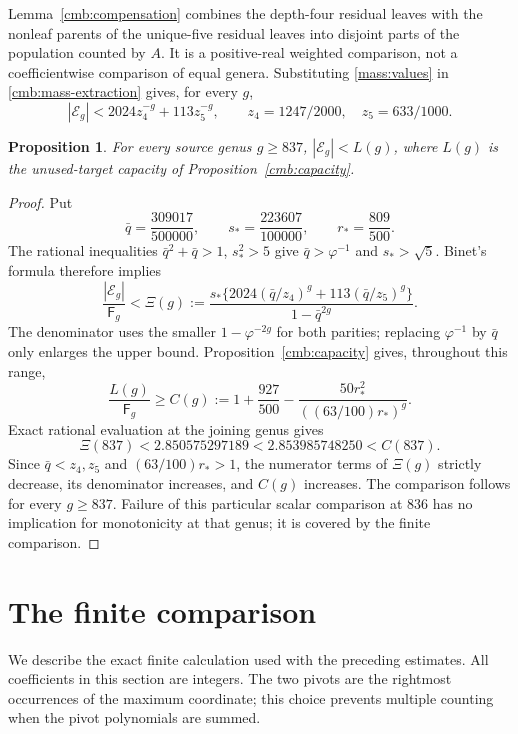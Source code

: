 \documentclass[11pt]{amsart}
\newtheorem{proposition}[theorem]{Proposition}
\theoremstyle{definition}
\theoremstyle{remark}
\newcommand{\Fib}{\mathsf F}
\numberwithin{equation}{section}
\begin{document}
Lemma~\ref{cmb:compensation} combines the depth-four residual leaves
with the nonleaf parents of the unique-five residual leaves into disjoint
parts of the population counted by $A$. It is a positive-real weighted
comparison, not a coefficientwise comparison of equal genera. Substituting
\eqref{mass:values} in \eqref{cmb:mass-extraction} gives, for every $g$,
\begin{equation}\label{mass:residual}
 |\mathcal E_g|<2024z_4^{-g}+113z_5^{-g},\qquad
 z_4=1247/2000,\quad z_5=633/1000.
\end{equation}

\begin{proposition}\label{mass:tail}
For every source genus $g\ge837$,
$|\mathcal E_g|<L(g)$, where $L(g)$ is the unused-target capacity
of Proposition~\ref{cmb:capacity}.
\end{proposition}

\begin{proof}
Put
\[
 \bar q=\frac{309017}{500000},\qquad s_* =\frac{223607}{100000},
 \qquad r_* =\frac{809}{500}.
\]
The rational inequalities $\bar q^2+\bar q>1$, $s_*^2>5$ give
$\bar q>\varphi^{-1}$ and $s_*>\sqrt5$. Binet's formula therefore implies
\[
 \frac{|\mathcal E_g|}{\Fib_g}
 < \Xi(g):=\frac{s_*\{2024(\bar q/z_4)^g+113(\bar q/z_5)^g\}}
 {1-\bar q^{2g}}.
\]
The denominator uses the smaller $1-\varphi^{-2g}$ for both parities;
replacing $\varphi^{-1}$ by $\bar q$ only enlarges the upper bound.
Proposition~\ref{cmb:capacity} gives, throughout this range,
\[
 \frac{L(g)}{\Fib_g}\ge
 C(g):=1+\frac{927}{500}
       -\frac{50r_*^2}{((63/100)r_*)^g}.
\]
Exact rational evaluation at the joining genus gives
\[
 \Xi(837)<2.850575297189
 <2.853985748250<C(837).
\]
Since $\bar q<z_4,z_5$ and $(63/100)r_*>1$, the numerator terms of
$\Xi(g)$ strictly decrease, its denominator increases, and $C(g)$
increases. The comparison follows for every $g\ge837$. Failure of
this particular scalar comparison at $836$ has no implication for
monotonicity at that genus; it is covered by the finite comparison.
\end{proof}


\section{The finite comparison}\label{sec:computation}

We describe the exact finite calculation used with the preceding estimates.
All coefficients in this section are integers. The two pivots are the
rightmost occurrences of the maximum coordinate; this choice prevents
multiple counting when the pivot polynomials are summed.
\end{document}
